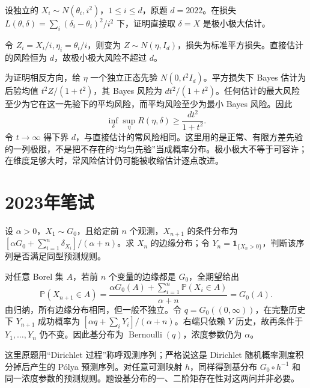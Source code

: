 \documentclass[UTF8,12pt,a4paper,fontset=fandol]{ctexbook}
\newcommand{\PP}{\mathbb P}
\begin{document}
\begin{example}[原题6：异方差正态均值的极小极大估计]\label{yau:2022-6}
设独立的 $X_i\sim N(\theta_i,i^2)$，$1\le i\le d$，原题 $d=2022$。在损失 $L(\theta,\delta)=\sum_i(\delta_i-\theta_i)^2/i^2$ 下，证明直接取 $\delta=X$ 是极小极大估计。
\end{example}
\begin{solve}
令 $Z_i=X_i/i,\eta_i=\theta_i/i$，则变为 $Z\sim N(\eta,I_d)$，损失为标准平方损失。直接估计的风险恒为 $d$，故极小极大风险不超过 $d$。

为证明相反方向，给 $\eta$ 一个独立正态先验 $N(0,t^2I_d)$。平方损失下 Bayes 估计为后验均值 $t^2Z/(1+t^2)$，其 Bayes 风险为 $dt^2/(1+t^2)$。任何估计的最大风险至少为它在这一先验下的平均风险，而平均风险至少为最小 Bayes 风险。因此
\[
\inf_\delta\sup_\eta R(\eta,\delta)\ge\frac{dt^2}{1+t^2}.
\]
令 $t\to\infty$ 得下界 $d$，与直接估计的常风险相同。这里用的是正常、有限方差先验的一列极限，不是把不存在的“均匀先验”当成概率分布。极小极大不等于可容许；在维度足够大时，常风险估计仍可能被收缩估计逐点改进。
\end{solve}


\section{2023年笔试}
\begin{example}[原题1：强化预测分布的边缘与映射]\label{yau:2023-1}
设 $\alpha>0$，$X_1\sim G_0$，且给定前 $n$ 个观测，$X_{n+1}$ 的条件分布为 $[\alpha G_0+\sum_{i=1}^n\delta_{X_i}]/(\alpha+n)$。求 $X_n$ 的边缘分布；令 $Y_n=\mathbf1_{\{X_n>0\}}$，判断该序列是否满足同型预测规则。
\end{example}
\begin{solve}
对任意 Borel 集 $A$，若前 $n$ 个变量的边缘都是 $G_0$，全期望给出
\[
\PP(X_{n+1}\in A)=\frac{\alpha G_0(A)+\sum_{i=1}^n\PP(X_i\in A)}{\alpha+n}=G_0(A).
\]
由归纳，所有边缘分布相同，但一般不独立。令 $q=G_0((0,\infty))$，在完整历史下 $Y_{n+1}$ 成功概率为 $[\alpha q+\sum_iY_i]/(\alpha+n)$。右端只依赖 $Y$ 历史，故再条件于 $Y_1,\ldots,Y_n$ 仍不变。因此基分布为 $\operatorname{Bernoulli}(q)$，浓度参数仍为 $\alpha$。

这里原题用“Dirichlet 过程”称呼观测序列；严格说这是 Dirichlet 随机概率测度积分掉后产生的 Pólya 预测序列。对任意可测映射 $h$，同样得到基分布 $G_0\circ h^{-1}$ 和同一浓度参数的预测规则。题设基分布的一、二阶矩存在性对这两问并非必要。
\end{solve}
\end{document}
